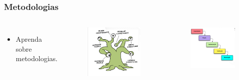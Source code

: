 \documentclass[    
  12pt, 
  compress,
  aspectratio=169,
  blue
  ]{beamer}
\begin{document}
\begin{frame}
\frametitle{ Metodologias}   
\begin{columns}[c]
\begin{itemize}
\item<1-> Aprenda sobre metodologias.
\end{itemize}

\begin{columns}[c]
\centering
\begin{figure}
\includegraphics[scale=0.3]{metodoloia1}
\end{figure}

\begin{figure}
\includegraphics[scale=0.3]{metodologia2}
\end{figure}


\end{columns}
\end{columns}
\end{frame}
\end{document}
